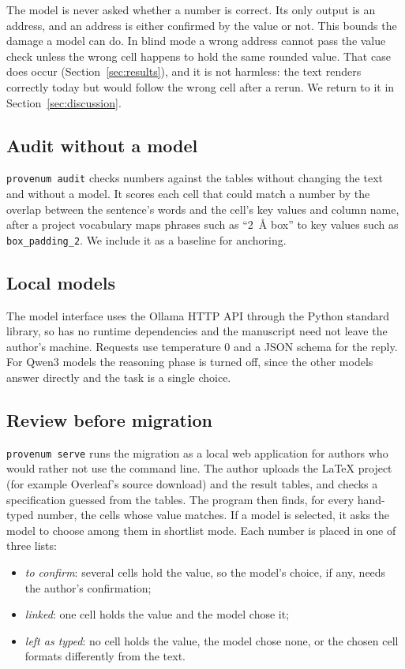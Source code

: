 The model is never asked whether a number is correct. Its only output is an address, and an
address is either confirmed by the value or not. This bounds the damage a model can do. In blind
mode a wrong address cannot pass the value check unless the wrong cell happens to hold the same
rounded value. That case does occur (Section~\ref{sec:results}), and it is not harmless: the text
renders correctly today but would follow the wrong cell after a rerun. We return to it in
Section~\ref{sec:discussion}.

\subsection{Audit without a model}

\texttt{provenum audit} checks numbers against the tables without changing the text and without a
model. It scores each cell that could match a number by the overlap between the sentence's words
and the cell's key values and column name, after a project vocabulary maps phrases such as
``2~\AA{} box'' to key values such as \texttt{box\_padding\_2}. We include it as a baseline for
anchoring.

\subsection{Local models}

The model interface uses the Ollama HTTP API through the Python standard library, so \pv{} has no
runtime dependencies and the manuscript need not leave the author's machine. Requests use
temperature 0 and a JSON schema for the reply. For Qwen3 models the reasoning phase is turned off,
since the other models answer directly and the task is a single choice.

\subsection{Review before migration}
\label{sec:review}

\texttt{provenum serve} runs the migration as a local web application for authors who would
rather not use the command line. The author uploads the LaTeX project (for example Overleaf's
source download) and the result tables, and checks a specification guessed from the tables. The
program then finds, for every hand-typed number, the cells whose value matches. If a model is
selected, it asks the model to choose among them in shortlist mode. Each number is placed in one
of three lists:
\begin{itemize}
\item \emph{to confirm}: several cells hold the value, so the model's choice, if any, needs the
author's confirmation;
\item \emph{linked}: one cell holds the value and the model chose it;
\item \emph{left as typed}: no cell holds the value, the model chose none, or the chosen cell
formats differently from the text.
\end{itemize}

